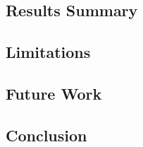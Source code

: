 \documentclass[english]{tktltiki2}
\theoremstyle{definition}
\theoremstyle{remark}
\begin{document}
\subsection{Results Summary} %
\subsection{Limitations} %
\subsection{Future Work} %
\subsection{Conclusion} %

% 




% 
\end{document}
